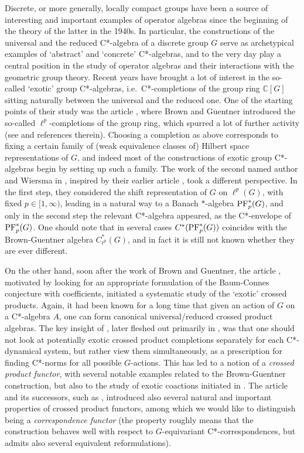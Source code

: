 \documentclass[12pt]{amsart}
\theoremstyle{definition}
\theoremstyle{remark}
\numberwithin{equation}{section}
\newcommand{\C}{\mathbb{C}}
\begin{document}
Discrete, or more generally, locally compact groups have been a source of interesting and important examples of operator algebras since the beginning of the theory of the latter in the 1940s. In particular, the constructions of the universal and the reduced C*-algebra of a discrete group $G$ serve as archetypical examples of `abstract' and `concrete' C*-algebras, and to the very day play a central position in the study of operator algebras and their interactions with the geometric group theory. Recent years have brought a lot of interest in the so-called `exotic' group C*-algebras, i.e.\ C*-completions of the group ring $\C[G]$ sitting naturally between the universal and the reduced one. One of the starting points of their study was the article \cite{BG}, where Brown and Guentner introduced the so-called $\ell^p$-completions of the group ring, which spurred a lot of further activity (see \cite{SW2} and references therein). Choosing a completion as above corresponds to fixing a certain family of (weak equivalence classes of) Hilbert space representations of $G$, and indeed most of the constructions of exotic group C*-algebras begin by setting up such a family. The work of the second named author and Wiersma in \cite{SW2}, inspired by their earlier article \cite{SW1}, took a different perspective. In the first step, they considered the shift representation of $G$ on $\ell^p(G)$, with fixed $p \in [1, \infty)$, leading in a natural way to a Banach $*$-algebra $\textup{PF}_p^*(G)$, and only in the second step the relevant C*-algebra appeared, as the C*-envelope of $\textup{PF}_p^*(G)$. One should note that in several cases $C^*(\textup{PF}_p^*(G))$ coincides with the Brown-Guentner algebra $C^*_{\ell^p}(G)$, and in fact it is still not known whether they are ever different.

On the other hand, soon after the work of Brown and Guentner, the article \cite{BGM}, motivated by looking for an appropriate formulation of the Baum-Connes conjecture with coefficients, initiated a systematic study of the `exotic' crossed products. Again, it had been known for a long time that given an action of $G$ on a C*-algebra $A$, one can form canonical universal/reduced crossed product algebras. The key insight of \cite{BGM}, later fleshed out primarily in \cite{BEW}, was that one should not look at potentially exotic crossed product completions separately for each C*-dynamical system, but rather view them simultaneously, as a prescription for finding C*-norms for all possible $G$-actions. This has led to a notion of a \emph{crossed product functor}, with several notable examples related to the Brown-Guentner construction, but also to the study of exotic coactions initiated in \cite{KLQNYJM}. The article \cite{BEW} and its successors, such as \cite{AEES}, introduced also several natural and important properties of crossed product functors, among which we would like to distinguish being a \emph{correspondence functor} (the property roughly means that the construction behaves well with respect to $G$-equivariant C*-correspondences, but admits also several equivalent reformulations).
\end{document}
